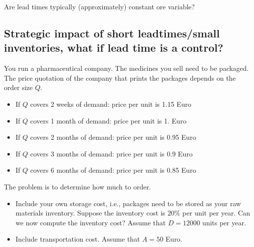 \begin{exercise}
  Are lead times typically (approximately) constant ore variable?

\end{exercise}



\subsection{Strategic impact of short leadtimes/small inventories,
  what if lead time is a control?}

You run a pharmaceutical company. The medicines you sell need to be
packaged. The price quotation of the company that prints the packages
depends on the order size $Q$.
  \begin{itemize}
  \item If $Q$ covers 2 weeks of demand: price per unit is 1.15 Euro
  \item If $Q$ covers 1 month of demand: price per unit is 1. Euro
  \item If $Q$ covers 2 months of demand: price per unit is 0.95 Euro
  \item If $Q$ covers 3 months of demand: price per unit is 0.9 Euro
  \item If $Q$ covers 6 months of demand: price per unit is 0.85 Euro
  \end{itemize}
The problem is to determine how much to order.

\begin{exercise}
  \begin{itemize}
  \item Include your own storage cost, i.e., packages need to be
    stored as your raw materials inventory.  Suppose the
    inventory cost is $20\%$ per unit per year. Can we now compute the
    inventory cost?  Assume that $D = 12000$ units per year.
  \item Include transportation cost.  Assume that $A = 50$ Euro.
  \end{itemize}
\end{exercise}

